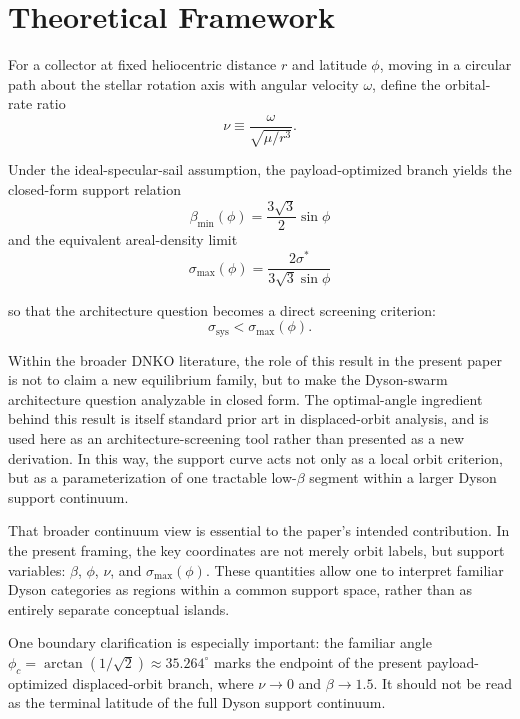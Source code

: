 \documentclass[11pt]{article}
\begin{document}
\section{Theoretical Framework}

For a collector at fixed heliocentric distance $r$ and latitude $\phi$, moving in a circular
path about the stellar rotation axis with angular velocity $\omega$, define the orbital-rate
ratio
\begin{equation}
\nu \equiv \frac{\omega}{\sqrt{\mu/r^3}}.
\end{equation}

Under the ideal-specular-sail assumption, the payload-optimized branch yields the closed-form
support relation
\begin{equation}
\beta_{\min}(\phi)=\frac{3\sqrt{3}}{2}\sin\phi
\end{equation}
\noindent and the equivalent areal-density limit
\begin{equation}
\sigma_{\max}(\phi)=\frac{2\sigma^*}{3\sqrt{3}\sin\phi}
\end{equation}

so that the architecture question becomes a direct screening criterion:
\begin{equation}
\sigma_{\mathrm{sys}} < \sigma_{\max}(\phi).
\end{equation}

Within the broader DNKO literature, the role of this result in the present paper is not to
claim a new equilibrium family, but to make the Dyson-swarm architecture question analyzable
in closed form. The optimal-angle ingredient behind this result is itself standard prior art
in displaced-orbit analysis, and is used here as an architecture-screening tool rather than
presented as a new derivation. In this way, the support curve acts not only as a local orbit
criterion, but as a parameterization of one tractable low-$\beta$ segment within a larger
Dyson support continuum.

That broader continuum view is essential to the paper's intended contribution. In the present
framing, the key coordinates are not merely orbit labels, but support variables: $\beta$,
$\phi$, $\nu$, and $\sigma_{\max}(\phi)$. These quantities allow one to interpret familiar
Dyson categories as regions within a common support space, rather than as entirely separate
conceptual islands.

One boundary clarification is especially important: the familiar angle
$\phi_c = \arctan(1/\sqrt{2}) \approx 35.264^\circ$ marks the endpoint of the present
payload-optimized displaced-orbit branch, where $\nu \to 0$ and $\beta \to 1.5$. It should
not be read as the terminal latitude of the full Dyson support continuum.
\end{document}

